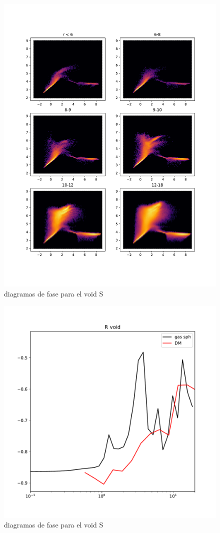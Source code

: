 \begin{figure}[h]
\centering
\includegraphics[width=15cm]{Figures/S1373_DF1.pdf}
\decoRule
\caption[asd]{diagramas de fase para el void S}
\label{fig:Electron}
\end{figure}

\begin{figure}[h]
\centering
\includegraphics[width=15cm]{Figures/R1198_sph1.pdf}
\decoRule
\caption[asd]{diagramas de fase para el void S}
\label{fig:Electron}
\end{figure}


